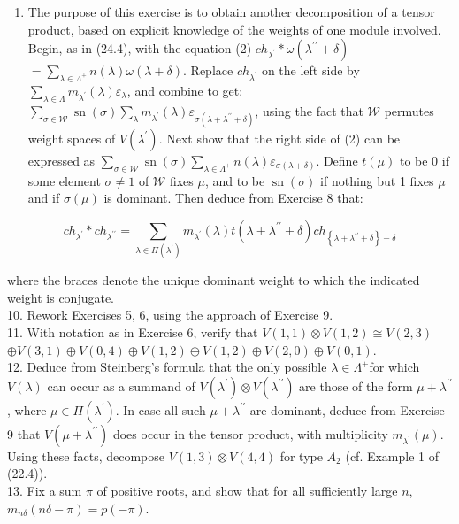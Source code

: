 \documentclass[10pt]{article}
\begin{document}
\begin{enumerate}
  \item The purpose of this exercise is to obtain another decomposition of a tensor product, based on explicit knowledge of the weights of one module involved. Begin, as in (24.4), with the equation (2) $c h_{\lambda^{\prime}} * \omega\left(\lambda^{\prime \prime}+\delta\right)$ $=\sum_{\lambda \in \Lambda^{+}} n(\lambda) \omega(\lambda+\delta)$. Replace $c h_{\lambda^{\prime}}$ on the left side by $\sum_{\lambda \in \Lambda} m_{\lambda^{\prime}}(\lambda) \varepsilon_{\lambda}$, and combine to get: $\sum_{\sigma \in \mathscr{W}} \operatorname{sn}(\sigma) \sum_{\lambda} m_{\lambda^{\prime}}(\lambda) \varepsilon_{\sigma\left(\lambda+\lambda^{\prime \prime}+\delta\right)}$, using the fact that $\mathscr{W}$ permutes weight spaces of $V\left(\lambda^{\prime}\right)$. Next show that the right side of (2) can be expressed as $\sum_{\sigma \in \mathscr{W}} \operatorname{sn}(\sigma) \sum_{\lambda \in \Lambda^{+}} n(\lambda) \varepsilon_{\sigma(\lambda+\delta)}$. Define $t(\mu)$ to be 0 if some element $\sigma \neq 1$ of $\mathscr{W}$ fixes $\mu$, and to be $\operatorname{sn}(\sigma)$ if nothing but 1 fixes $\mu$ and if $\sigma(\mu)$ is dominant. Then deduce from Exercise 8 that:
\end{enumerate}

$$
c h_{\lambda^{\prime}} * c h_{\lambda^{\prime \prime}}=\sum_{\lambda \in \Pi\left(\lambda^{\prime}\right)} m_{\lambda^{\prime}}(\lambda) t\left(\lambda+\lambda^{\prime \prime}+\delta\right) c h_{\left\{\lambda+\lambda^{\prime \prime}+\delta\right\}-\delta}
$$

where the braces denote the unique dominant weight to which the indicated weight is conjugate.\\
10. Rework Exercises 5, 6, using the approach of Exercise 9.\\
11. With notation as in Exercise 6, verify that $V(1,1) \otimes V(1,2) \cong V(2,3)$ $\oplus V(3,1) \oplus V(0,4) \oplus V(1,2) \oplus V(1,2) \oplus V(2,0) \oplus V(0,1)$.\\
12. Deduce from Steinberg's formula that the only possible $\lambda \in \Lambda^{+}$for which $V(\lambda)$ can occur as a summand of $V\left(\lambda^{\prime}\right) \otimes V\left(\lambda^{\prime \prime}\right)$ are those of the form $\mu+\lambda^{\prime \prime}$, where $\mu \in \Pi\left(\lambda^{\prime}\right)$. In case all such $\mu+\lambda^{\prime \prime}$ are dominant, deduce from Exercise 9 that $V\left(\mu+\lambda^{\prime \prime}\right)$ does occur in the tensor product, with multiplicity $m_{\lambda^{\prime}}(\mu)$. Using these facts, decompose $V(1,3) \otimes V(4,4)$ for type $A_{2}$ (cf. Example 1 of (22.4)).\\
13. Fix a sum $\pi$ of positive roots, and show that for all sufficiently large $n$, $m_{n \delta}(n \delta-\pi)=p(-\pi)$.
\end{document}
